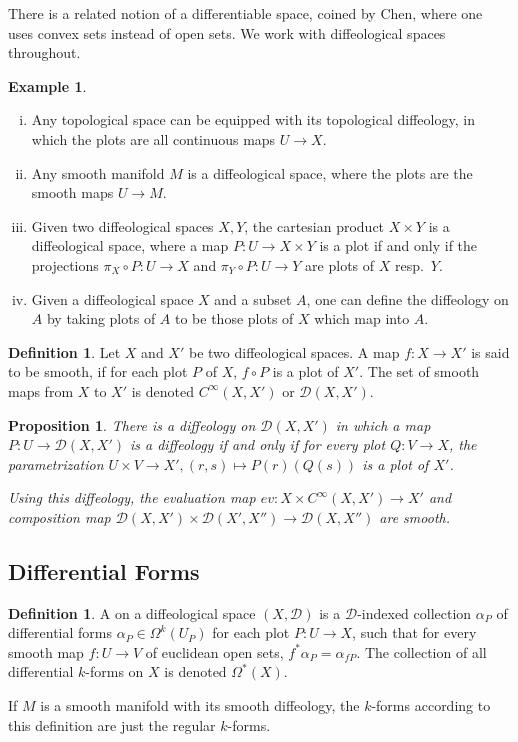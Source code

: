 \documentclass{scrartcl}
\let\emph\relax
\newcommand{\emphi}[1]{\index{#1}\emph{#1}}
\theoremstyle{plain}
\newtheorem{proposition}[theorem]{Proposition}
\theoremstyle{definition}
\newtheorem{definition}[theorem]{Definition}
\newtheorem{example}[theorem]{Example}
\newcommand{\comp}{\mathbin{\circ}}
\begin{document}
There is a related notion of a differentiable space, coined by Chen, where one uses convex sets instead of open sets. We work with diffeological spaces throughout.

\begin{example}\begin{enumerate}[(i)]
    \item Any topological space can be equipped with its topological diffeology, in which the plots are all continuous maps $U\to X$.
    \item Any smooth manifold $M$ is a diffeological space, where the plots are the smooth maps $U\to M$.
    \item Given two diffeological spaces $X, Y$, the cartesian product $X\times Y$ is a diffeological space, where a map $P\colon U\to X\times Y$ is a plot if and only if the projections $\pi_X \comp P \colon U\to X$ and $\pi_Y\comp P\colon U\to Y$ are plots of $X$ resp.\ $Y$.
    \item Given a diffeological space $X$ and a subset $A$, one can define the diffeology on $A$ by taking plots of $A$ to be those plots of $X$ which map into $A$.
\end{enumerate}\end{example}
\begin{definition}
    Let $X$ and $X'$ be two diffeological spaces. A map $f\colon X\to X'$ is said to be smooth, if for each plot $P$ of $X$, $f\comp P$ is a plot of $X'$. The set of smooth maps from $X$ to $X'$ is denoted $C^\infty(X, X')$ or $\mathcal D(X, X')$.
\end{definition}
\begin{proposition}
    There is a diffeology on $\mathcal D(X, X')$ in which a map $P\colon U\to \mathcal D(X, X')$ is a diffeology if and only if for every plot $Q\colon V\to X$, the parametrization $U\times V\to X', (r,s)\mapsto P(r)(Q(s))$ is a plot of $X'$. 
    
    Using this diffeology, the evaluation map $ev\colon X\times C^\infty(X, X') \to X'$ and composition map $\mathcal D(X, X')\times \mathcal D(X', X'')\to \mathcal D(X, X'')$ are smooth.
\end{proposition}

\subsection{Differential Forms}
\begin{definition}
    A \emphi{differential $k$-form} on a diffeological space $(X,\mathcal D)$ is a $\mathcal D$-indexed collection $\alpha_P$ of differential forms $\alpha_P\in \Omega^k(U_P)$ for each plot $P\colon U\to X$, such that for every smooth map $f\colon U\to V$ of euclidean open sets, $f^*\alpha_P = \alpha_{fP}$. The collection of all differential $k$-forms on $X$ is denoted $\Omega^*(X)$.
\end{definition}
If $M$ is a smooth manifold with its smooth diffeology, the $k$-forms according to this definition are just the regular $k$-forms. 
\end{document}
